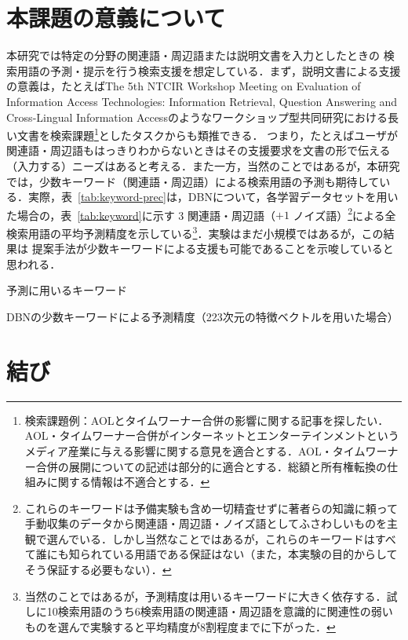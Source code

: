 \documentclass[japanese]{jnlp_1.4}
\begin{document}
\section{本課題の意義について}

本研究では特定の分野の関連語・周辺語または説明文書を入力としたときの
\pagebreak
検索用語の予測・提示を行う検索支援を想定している．まず，説明文書による支援の意義は，たとえばThe 5th NTCIR Workshop Meeting on 
Evaluation of Information Access Technologies: Information Retrieval, Question Answering and Cross-Lingual Information Accessのようなワークショップ型共同研究\cite{Ma}における長い文書を検索課題\footnote{検索課題例：AOLとタイムワーナー合併の影響に関する記事を探したい．AOL・タイムワーナー合併がインターネットとエンターテインメントというメディア産業に与える影響に関する意見を適合とする．AOL・タイムワーナー合併の展開についての記述は部分的に適合とする．総額と所有権転換の仕組みに関する情報は不適合とする．}としたタスクからも類推できる．
つまり，たとえばユーザが関連語・周辺語もはっきりわからないときはその支援要求を文書の形で伝える（入力する）ニーズはあると考える．また一方，当然のことではあるが，本研究では，少数キーワード（関連語・周辺語）による検索用語の予測も期待している．実際，表~\ref{tab:keyword-prec}は，DBNについて，各学習データセットを用いた場合の，表~\ref{tab:keyword}に示す 3 関連語・周辺語（$+1$ ノイズ語）\footnote{これらのキーワードは予備実験も含め一切精査せずに著者らの知識に頼って手動収集のデータから関連語・周辺語・ノイズ語としてふさわしいものを主観で選んでいる．しかし当然なことではあるが，これらのキーワードはすべて誰にも知られている用語である保証はない（また，本実験の目的からしてそう保証する必要もない）．}による全検索用語の平均予測精度を示している\footnote{当然のことではあるが，予測精度は用いるキーワードに大きく依存する．試しに10検索用語のうち6検索用語の関連語・周辺語を意識的に関連性の弱いものを選んで実験すると平均精度が8割程度までに下がった．}．実験はまだ小規模ではあるが，この結果は
提案手法が少数キーワードによる支援も可能であることを示唆していると思われる．

\begin{table}[t]
\caption{予測に用いるキーワード}
\label{tab:keyword}

\end{table}
\begin{table}[t]
\caption{DBNの少数キーワードによる予測精度（223次元の特徴ベクトルを用いた場合）}
\label{tab:keyword-prec}

\end{table}


\section{結び}
\end{document}
